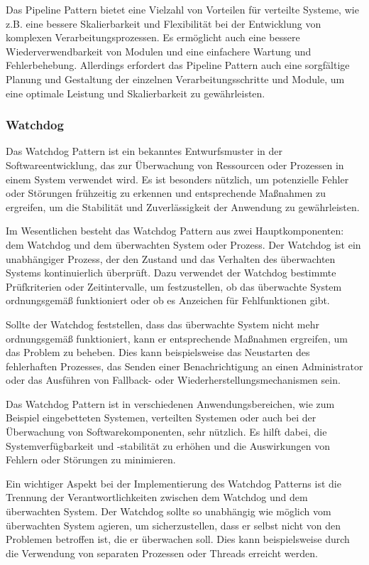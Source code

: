Das Pipeline Pattern bietet eine Vielzahl von Vorteilen für verteilte Systeme, wie z.B. eine bessere Skalierbarkeit und Flexibilität bei der Entwicklung von komplexen Verarbeitungsprozessen. Es ermöglicht auch eine bessere Wiederverwendbarkeit von Modulen und eine einfachere Wartung und Fehlerbehebung. Allerdings erfordert das Pipeline Pattern auch eine sorgfältige Planung und Gestaltung der einzelnen Verarbeitungsschritte und Module, um eine optimale Leistung und Skalierbarkeit zu gewährleisten.

\subsubsection{Watchdog}
Das Watchdog Pattern ist ein bekanntes Entwurfsmuster in der Softwareentwicklung, das zur Überwachung von Ressourcen oder Prozessen in einem System verwendet wird. Es ist besonders nützlich, um potenzielle Fehler oder Störungen frühzeitig zu erkennen und entsprechende Maßnahmen zu ergreifen, um die Stabilität und Zuverlässigkeit der Anwendung zu gewährleisten.

Im Wesentlichen besteht das Watchdog Pattern aus zwei Hauptkomponenten: dem Watchdog und dem überwachten System oder Prozess. Der Watchdog ist ein unabhängiger Prozess, der den Zustand und das Verhalten des überwachten Systems kontinuierlich überprüft. Dazu verwendet der Watchdog bestimmte Prüfkriterien oder Zeitintervalle, um festzustellen, ob das überwachte System ordnungsgemäß funktioniert oder ob es Anzeichen für Fehlfunktionen gibt.

Sollte der Watchdog feststellen, dass das überwachte System nicht mehr ordnungsgemäß funktioniert, kann er entsprechende Maßnahmen ergreifen, um das Problem zu beheben. Dies kann beispielsweise das Neustarten des fehlerhaften Prozesses, das Senden einer Benachrichtigung an einen Administrator oder das Ausführen von Fallback- oder Wiederherstellungsmechanismen sein.

Das Watchdog Pattern ist in verschiedenen Anwendungsbereichen, wie zum Beispiel eingebetteten Systemen, verteilten Systemen oder auch bei der Überwachung von Softwarekomponenten, sehr nützlich. Es hilft dabei, die Systemverfügbarkeit und -stabilität zu erhöhen und die Auswirkungen von Fehlern oder Störungen zu minimieren.

Ein wichtiger Aspekt bei der Implementierung des Watchdog Patterns ist die Trennung der Verantwortlichkeiten zwischen dem Watchdog und dem überwachten System. Der Watchdog sollte so unabhängig wie möglich vom überwachten System agieren, um sicherzustellen, dass er selbst nicht von den Problemen betroffen ist, die er überwachen soll. Dies kann beispielsweise durch die Verwendung von separaten Prozessen oder Threads erreicht werden.

